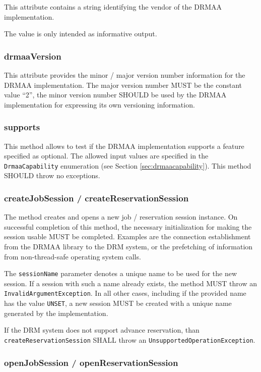 \documentclass{article}
\newcommand{\h}[1]{\lstinline|#1|}
\begin{document}
This attribute contains a string identifying the vendor of the DRMAA implementation.

The value is only intended as informative output.

\subsubsection{drmaaVersion}

This attribute provides the minor / major version number information for the DRMAA implementation. The major version number MUST be the constant value \enquote{2}, the minor version number SHOULD be used by the DRMAA implementation for expressing its own versioning information.

\subsubsection{supports}
\label{sec:supports}

This method allows to test if the DRMAA implementation supports a feature specified as optional. The allowed input values are specified in the \h{DrmaaCapability} enumeration (see Section \ref{sec:drmaacapability}). This method SHOULD throw no exceptions.

\subsubsection{createJobSession / createReservationSession}
\label{sec:createJobSession}

The method creates and opens a new job / reservation session instance. On successful completion of this method, the necessary initialization for making the session usable MUST be completed. Examples are the connection establishment from the DRMAA library to the DRM system, or the prefetching of information from non-thread-safe operating system calls.

The \h{sessionName} parameter denotes a unique name to be used for the new session. If a session with such a name already exists, the method MUST throw an \h{InvalidArgumentException}. In all other cases, including if the provided name has the value \h{UNSET}, a new session MUST be created with a unique name generated by the implementation. 

If the DRM system does not support advance reservation, than \h{createReservationSession} SHALL throw an \h{UnsupportedOperationException}.

\subsubsection{openJobSession / openReservationSession}
\end{document}
